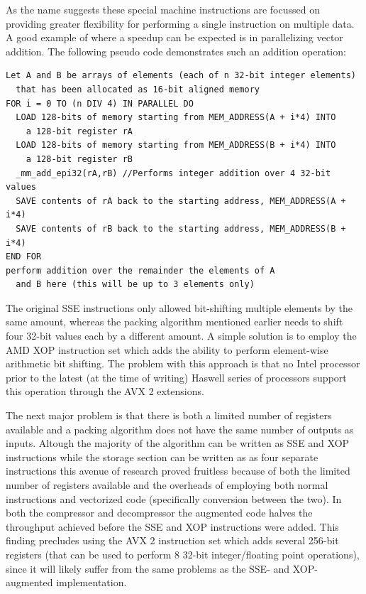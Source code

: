   As the name suggests these special machine instructions are focussed on providing greater flexibility for performing a single instruction on multiple data. A good example of where
  a speedup can be expected is in parallelizing vector addition. The following pseudo code demonstrates such an addition operation:
  \begin{verbatim}
Let A and B be arrays of elements (each of n 32-bit integer elements) 
  that has been allocated as 16-bit aligned memory
FOR i = 0 TO (n DIV 4) IN PARALLEL DO
  LOAD 128-bits of memory starting from MEM_ADDRESS(A + i*4) INTO 
    a 128-bit register rA
  LOAD 128-bits of memory starting from MEM_ADDRESS(B + i*4) INTO 
    a 128-bit register rB
  _mm_add_epi32(rA,rB) //Performs integer addition over 4 32-bit values
  SAVE contents of rA back to the starting address, MEM_ADDRESS(A + i*4)
  SAVE contents of rB back to the starting address, MEM_ADDRESS(B + i*4)
END FOR
perform addition over the remainder the elements of A 
  and B here (this will be up to 3 elements only)
  \end{verbatim}
  The original SSE instructions only allowed bit-shifting multiple elements by the same amount, whereas the packing algorithm mentioned earlier needs to shift four 
  32-bit values each by a different amount. A simple solution is to employ the AMD XOP instruction set which adds the ability to perform element-wise arithmetic bit 
  shifting. The problem with this approach is that no Intel processor prior to the latest (at the time of writing) Haswell series of processors support this operation
  through the AVX 2 extensions.
  
  The next major problem is that there is both a limited number of registers available and a packing algorithm does not have the same number of outputs as inputs. Altough
  the majority of the algorithm can be written as SSE and XOP instructions while the storage section can be written as as four separate instructions this avenue of research
  proved fruitless because of both the limited number of registers available and the overheads of employing both normal instructions and vectorized code (specifically conversion
  between the two). In both the compressor and decompressor the augmented code halves the throughput achieved before the SSE and XOP instructions were added. This finding precludes
  using the AVX 2 instruction set which adds several 256-bit registers (that can be used to perform 8 32-bit integer/floating point operations), since it will likely suffer from
  the same problems as the SSE- and XOP-augmented implementation.
